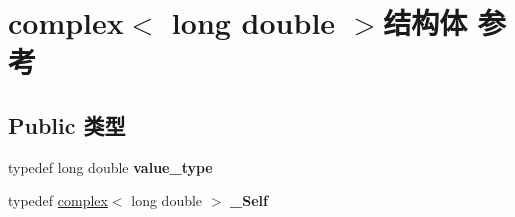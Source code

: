 \hypertarget{structcomplex_3_01long_01double_01_4}{}\section{complex$<$ long double $>$结构体 参考}
\label{structcomplex_3_01long_01double_01_4}
\subsection*{Public 类型}
\begin{DoxyCompactItemize}
\item 
\mbox{\label{structcomplex_3_01long_01double_01_4_ad1c509dbe4ca07dd6be08b7ca44e4e82}} 
typedef long double {\bfseries value\+\_\+type}
\item 
\mbox{\label{structcomplex_3_01long_01double_01_4_af214ad151ab38dfe09c9cb1a91133a35}} 
typedef \hyperlink{structcomplex}{complex}$<$ long double $>$ {\bfseries \+\_\+\+Self}
\end{DoxyCompactItemize}
